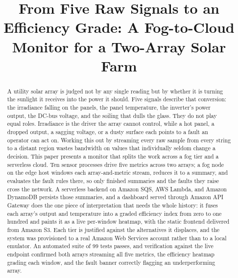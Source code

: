 \documentclass[conference]{IEEEtran}
\begin{document}
\title{From Five Raw Signals to an Efficiency Grade: A Fog-to-Cloud Monitor for a Two-Array Solar Farm}

\author{
}

\maketitle

\begin{abstract}
A utility solar array is judged not by any single reading but by whether it is turning the sunlight it receives into the power it should. Five signals describe that conversion: the irradiance falling on the panels, the panel temperature, the inverter's power output, the DC-bus voltage, and the soiling that dulls the glass. They do not play equal roles. Irradiance is the driver the array cannot control, while a hot panel, a dropped output, a sagging voltage, or a dusty surface each points to a fault an operator can act on. Working this out by streaming every raw sample from every string to a distant region wastes bandwidth on values that individually seldom change a decision. This paper presents a monitor that splits the work across a fog tier and a serverless cloud. Ten sensor processes drive five metrics across two arrays; a fog node on the edge host windows each array-and-metric stream, reduces it to a summary, and evaluates the fault rules there, so only finished summaries and the faults they raise cross the network. A serverless backend on Amazon SQS, AWS Lambda, and Amazon DynamoDB persists those summaries, and a dashboard served through Amazon API Gateway does the one piece of interpretation that needs the whole history: it fuses each array's output and temperature into a graded efficiency index from zero to one hundred and paints it as a live per-window heatmap, with the static frontend delivered from Amazon S3. Each tier is justified against the alternatives it displaces, and the system was provisioned to a real Amazon Web Services account rather than to a local emulator. An automated suite of 99 tests passes, and verification against the live endpoint confirmed both arrays streaming all five metrics, the efficiency heatmap grading each window, and the fault banner correctly flagging an underperforming array.
\end{abstract}
\end{document}
